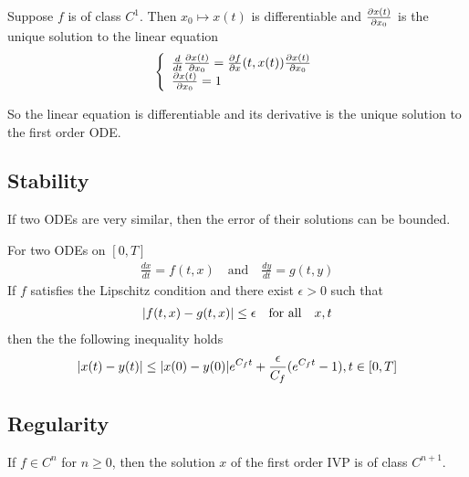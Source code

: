 \begin{thm}[]

Suppose $f$ is of class $C^{1}$. Then $x_0 \mapsto x(t)$ is differentiable and $\frac{\partial x(t)}{\partial x_0}$ is the unique solution to the linear equation
\begin{align*}
  \left\{\begin{array}{l}
      \frac{d }{d t}\frac{\partial x(t)}{\partial x_0} = \frac{\partial f}{\partial x}(t,x(t)) \frac{\partial x(t)}{\partial x_0}\\
      \frac{\partial x(t)}{\partial x_0} = 1
  \end{array} \right.
\end{align*}
\end{thm}
So the linear equation is differentiable and its derivative is the unique solution to the first order ODE.
\subsection{Stability}
If two ODEs are very similar, then the error of their solutions can be bounded.
\begin{thm}
  For two ODEs on $[0,T]$
  \begin{align*}
    \frac{d x}{d t} = f(t,x) \quad \text{and} \quad \frac{d y}{d t}= g(t,y)
  \end{align*}
  If $f$ satisfies the Lipschitz condition and there exist $\epsilon> 0$ such that 
  \begin{align*}
    \vert f(t,x) - g(t,x)\vert \leq \epsilon \quad \text{for all} \quad x,t
  \end{align*}
  then the the following inequality holds
  \begin{align*}
    \vert x(t) - y(t)\vert \leq \vert x(0) - y(0)\vert e^{C_f t} + \frac{\epsilon}{C_f} (e^{C_f t} - 1), t \in [0,T]
  \end{align*}
\end{thm}

\subsection{Regularity}
If $f \in C^{n}$ for $n \geq 0$, then the solution $x$ of the first order IVP is of class $C^{n+1}$.

